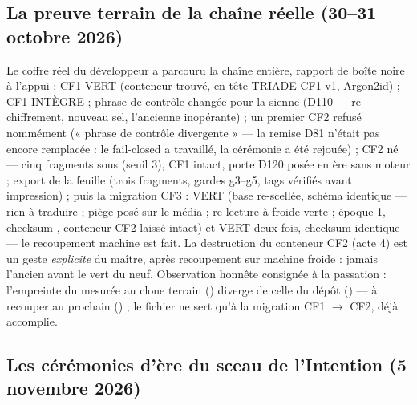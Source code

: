 \subsection{La preuve terrain de la chaîne réelle (30--31 octobre 2026)}\label{sec:preuveterrain}

Le coffre réel du développeur a parcouru la chaîne entière, rapport de boîte noire à
l'appui : CF1  VERT (conteneur trouvé, en-tête TRIADE-CF1 v1, Argon2id) ;
CF1  INTÈGRE ; phrase de contrôle changée pour la sienne (D110 —
re-chiffrement, nouveau sel, l'ancienne inopérante) ; un premier  CF2
refusé nommément (« phrase de contrôle divergente » — la remise D81 n'était pas encore
remplacée : le fail-closed a travaillé, la cérémonie a été rejouée) ; CF2 né — cinq
fragments sous  (seuil 3), CF1 intact, porte D120 posée en ère
sans moteur ; export de la feuille (trois fragments, gardes g3--g5, tags vérifiés avant
impression) ; puis la migration CF3 :  VERT (base re-scellée, schéma
identique — rien à traduire ; piège posé sur le média ; re-lecture à froide verte ;
époque 1, checksum , conteneur CF2 laissé intact) et  VERT
deux fois, checksum identique — le recoupement machine est fait. La destruction du
conteneur CF2 (acte 4) est un geste \emph{explicite} du maître, après recoupement sur
machine froide : jamais l'ancien avant le vert du neuf. Observation honnête consignée à
la passation : l'empreinte du  mesurée au clone terrain
() diverge de celle du dépôt () — à recouper au
prochain  () ; le fichier ne sert qu'à la migration
CF1 $\to$ CF2, déjà accomplie.

\subsection{Les cérémonies d'ère du sceau de l'Intention (5 novembre 2026)}\label{sec:ceremoniesere}

